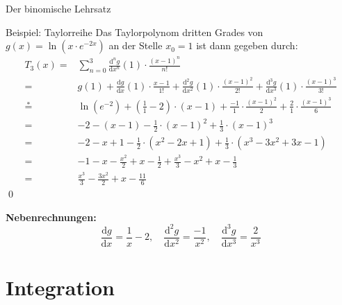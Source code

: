 \documentclass[german]{spicker}
\begin{document}
\begin{defi}{Der binomische Lehrsatz}
\begin{bonus}{Beispiel: Taylorreihe}
    Das Taylorpolynom dritten Grades von $g(x) = \ln(x\cdot e^{-2x})$ an der Stelle $x_0 = 1$ ist dann gegeben durch:
    $$
        \begin{aligned}
            T_3(x) ={}      & \sum_{n=0}^3 \frac{\mathrm{d}^n g}{\mathrm{d}x^n} (1)\cdot\frac{(x-1)^n}{n!}                                                                                                                       \\
            ={}             & g(1) + \frac{\mathrm{d} g}{\mathrm{d} x}(1)\cdot\frac{x-1}{1!} + \frac{\mathrm{d^2} g}{\mathrm{d} x^2}(1)\cdot\frac{(x-1)^2}{2!} + \frac{\mathrm{d^3} g}{\mathrm{d} x^3}(1)\cdot\frac{(x-1)^3}{3!} \\
            \stackrel{*}={} & \ln(e^{-2}) + \left( \frac{1}{1}- 2 \right)\cdot(x-1) + \frac{-1}{1}\cdot\frac{(x-1)^2}{2} + \frac{2}{1}\cdot\frac{(x-1)^3}{6}                                                                     \\
            ={}             & -2 -(x-1) - \frac{1}{2}\cdot (x-1)^2 +\frac{1}{3}\cdot (x-1)^3                                                                                                                                     \\
            ={}             & -2 -x+1 - \frac{1}{2}\cdot (x^2-2x+1) +\frac{1}{3}\cdot (x^3 -3x^2+3x-1)                                                                                                                           \\
            ={}             & -1 -x - \frac{x^2}{2} + x -\frac{1}{2} +\frac{x^3}{3} - x^2 + x -\frac{1}{3}                                                                                                                       \\
            ={}             & \frac{x^3}{3}- \frac{3x^2}{2} + x - \frac{11}{6}
        \end{aligned}
    $$
    \qed

    \vspace{2em}

    \textbf{Nebenrechnungen:}
    $$
        \frac{\mathrm{d} g}{\mathrm{d} x} = \frac{1}{x} - 2, \quad
        \frac{\mathrm{d}^2 g}{\mathrm{d} x^2} = \frac{-1}{x^2}, \quad
        \frac{\mathrm{d}^3 g}{\mathrm{d} x^3} = \frac{2}{x^3}
    $$
\end{bonus}

\newpage
\section{Integration}

\end{defi}
\end{document}
